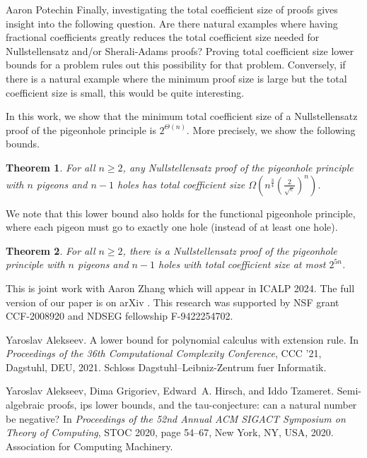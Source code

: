 \documentclass[report]{owrart}
\newtheorem{theorem}{Theorem}
\begin{document}
\begin{report}
\begin{talk}{Aaron Potechin}
Finally, investigating the total coefficient size of proofs gives insight into the following question. Are there natural examples where having fractional coefficients greatly reduces the total coefficient size needed for Nullstellensatz and/or Sherali-Adams proofs? Proving total coefficient size lower bounds for a problem rules out this possibility for that problem. Conversely, if there is a natural example where the minimum proof size is large but the total coefficient size is small, this would be quite interesting.

In this work, we show that the minimum total coefficient size of a Nullstellensatz proof of the pigeonhole principle is $2^{\Theta(n)}$. More precisely, we show the following bounds.
\begin{theorem}\label{thm:pigeonholelowerbound}
For all $n \geq 2$, any Nullstellensatz proof of the pigeonhole principle with $n$ pigeons and $n-1$ holes has total coefficient size $\Omega\left(n^{\frac{3}{4}}\left(\frac{2}{\sqrt{e}}\right)^{n}\right)$.
\end{theorem}
We note that this lower bound also holds for the functional pigeonhole principle, where each pigeon must go to exactly one hole (instead of at least one hole).
\begin{theorem}
For all $n \geq 2$, there is a Nullstellensatz proof of the pigeonhole principle with $n$ pigeons and $n-1$ holes with total coefficient size at most $2^{5n}$.
\end{theorem}
This is joint work with Aaron Zhang which will appear in ICALP 2024. The full version of our paper is on arXiv \cite{potechin2022bounds}. This research was supported by NSF grant CCF-2008920 and NDSEG fellowship F-9422254702.

\begin{thebibliography}{99}
Yaroslav Alekseev.
\newblock A lower bound for polynomial calculus with extension rule.
\newblock In {\em Proceedings of the 36th Computational Complexity Conference},
  CCC '21, Dagstuhl, DEU, 2021. Schloss Dagstuhl--Leibniz-Zentrum fuer
  Informatik.

Yaroslav Alekseev, Dima Grigoriev, Edward~A. Hirsch, and Iddo Tzameret.
\newblock Semi-algebraic proofs, ips lower bounds, and the tau-conjecture: can
  a natural number be negative?
\newblock In {\em Proceedings of the 52nd Annual ACM SIGACT Symposium on Theory
  of Computing}, STOC 2020, page 54–67, New York, NY, USA, 2020. Association
  for Computing Machinery.


\end{thebibliography}
\end{talk}
\end{report}
\end{document}

